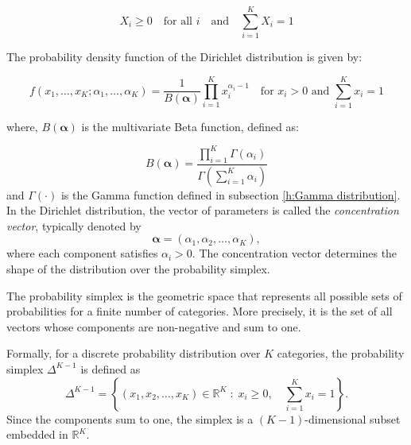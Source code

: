 \documentclass[12pt,a4paper]{article}
\begin{document}
	\begin{equation}
		X_i \geq 0 \quad \text{for all } i \quad \text{and} \quad \sum_{i=1}^K X_i = 1
	\end{equation}
	
	The probability density function of the Dirichlet distribution is given by:
	
	\begin{equation}
		f(x_1, \ldots, x_K; \alpha_1, \ldots, \alpha_K) = 
		\frac{1}{B(\boldsymbol{\alpha})} \prod_{i=1}^K x_i^{\alpha_i - 1}
		\quad \text{for } x_i > 0 \text{ and } \sum_{i=1}^K x_i = 1
		\label{eq:dirichlet_pdf}
	\end{equation}
	
	where, \( B(\boldsymbol{\alpha}) \) is the multivariate Beta function, defined as:
	
	\begin{equation}
		B(\boldsymbol{\alpha}) = \frac{\prod_{i=1}^K \Gamma(\alpha_i)}{\Gamma\left( \sum_{i=1}^K \alpha_i \right)}
		\label{eq:multivariate_beta_function}
	\end{equation}
	and  \( \Gamma(\cdot) \) is the Gamma function defined in subsection \ref{h:Gamma distribution}.
	\noindent
	In the Dirichlet distribution, the vector of parameters is called the \textit{concentration vector}, typically denoted by
	\[
	\boldsymbol{\alpha} = (\alpha_1, \alpha_2, \dots, \alpha_K),
	\]
	where each component satisfies \( \alpha_i > 0 \). The concentration vector determines the shape of the distribution over the probability simplex.
	
	The probability simplex is the geometric space that represents all possible sets of probabilities for a finite number of categories. More precisely, it is the set of all vectors whose components are non-negative and sum to one.
	
	Formally, for a discrete probability distribution over \(K\) categories, the  probability simplex \(\Delta^{K-1}\) is defined as
	\[
	\Delta^{K-1} = \left\{ (x_1, x_2, \ldots, x_K) \in \mathbb{R}^K \; : \; x_i \geq 0, \quad \sum_{i=1}^K x_i = 1 \right\}.
	\]
	Since the components sum to one, the simplex is a \((K-1)\)-dimensional subset embedded in \(\mathbb{R}^K\).
	
\end{document}
